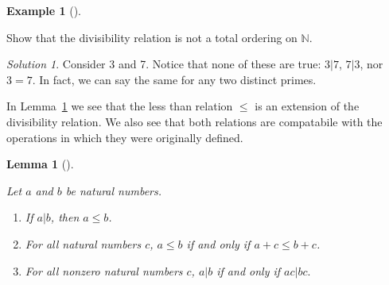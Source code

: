 \documentclass[
  twoside,
  12pt,
  letterpaper]{article}
\providecommand{\tightlist}{%
  \setlength{\itemsep}{0pt}\setlength{\parskip}{0pt}}\usepackage{longtable,booktabs,array}
\theoremstyle{definition}
\theoremstyle{definition}
\theoremstyle{plain}
\theoremstyle{definition}
\newtheorem{example}{Example}[section]
\theoremstyle{plain}
\newtheorem{lemma}{Lemma}[section]
\theoremstyle{remark}
\newtheorem*{solution}{Solution}
\begin{document}
\begin{example}[]\protect\hypertarget{exm-div-trich}{}\label{exm-div-trich}

Show that the divisibility relation is not a total ordering on
\(\mathbb{N}\).

\end{example}

\begin{solution}

Consider 3 and 7. Notice that none of these are true: \(3|7\), \(7|3\),
nor \(3=7\). In fact, we can say the same for any two distinct primes.

\end{solution}

In Lemma~\ref{lem-ordering-props} we see that the less than relation
\(\leq\) is an extension of the divisibility relation. We also see that
both relations are compatabile with the operations in which they were
originally defined.

\begin{lemma}[]\protect\hypertarget{lem-ordering-props}{}\label{lem-ordering-props}

Let \(a\) and \(b\) be natural numbers.

\begin{enumerate}
\def\labelenumi{\arabic{enumi}.}
\tightlist
\item
  If \(a|b\), then \(a\leq b\).
\item
  For all natural numbers \(c\), \(a\leq b\) if and only if
  \(a+c\leq b+c\).
\item
  For all nonzero natural numbers \(c\), \(a|b\) if and only if
  \(ac|bc.\)
\end{enumerate}

\end{lemma}
\end{document}
